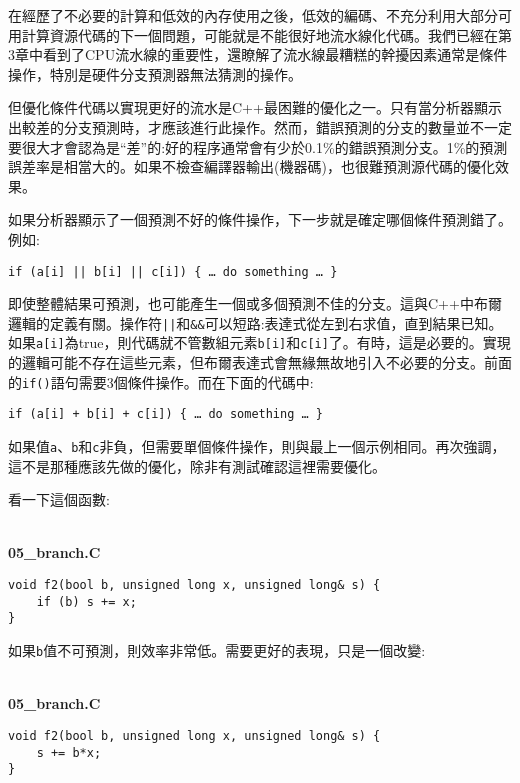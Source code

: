 在經歷了不必要的計算和低效的內存使用之後，低效的編碼、不充分利用大部分可用計算資源代碼的下一個問題，可能就是不能很好地流水線化代碼。我們已經在第3章中看到了CPU流水線的重要性，還瞭解了流水線最糟糕的幹擾因素通常是條件操作，特別是硬件分支預測器無法猜測的操作。 

但優化條件代碼以實現更好的流水是C++最困難的優化之一。只有當分析器顯示出較差的分支預測時，才應該進行此操作。然而，錯誤預測的分支的數量並不一定要很大才會認為是“差”的:好的程序通常會有少於0.1\%的錯誤預測分支。1\%的預測誤差率是相當大的。如果不檢查編譯器輸出(機器碼)，也很難預測源代碼的優化效果。

如果分析器顯示了一個預測不好的條件操作，下一步就是確定哪個條件預測錯了。例如:

\begin{lstlisting}[style=styleCXX]
if (a[i] || b[i] || c[i]) { … do something … }
\end{lstlisting}

即使整體結果可預測，也可能產生一個或多個預測不佳的分支。這與C++中布爾邏輯的定義有關。操作符\texttt{||}和\texttt{\&\&}可以短路:表達式從左到右求值，直到結果已知。如果\texttt{a[i]}為true，則代碼就不管數組元素\texttt{b[i]}和\texttt{c[i]}了。有時，這是必要的。實現的邏輯可能不存在這些元素，但布爾表達式會無緣無故地引入不必要的分支。前面的\texttt{if()}語句需要3個條件操作。而在下面的代碼中:

\begin{lstlisting}[style=styleCXX]
if (a[i] + b[i] + c[i]) { … do something … }
\end{lstlisting}

如果值\texttt{a}、\texttt{b}和\texttt{c}非負，但需要單個條件操作，則與最上一個示例相同。再次強調，這不是那種應該先做的優化，除非有測試確認這裡需要優化。

看一下這個函數:

\hspace*{\fill} \\ %
\noindent
\textbf{05\_branch.C}
\begin{lstlisting}[style=styleCXX]
void f2(bool b, unsigned long x, unsigned long& s) {
	if (b) s += x;
}
\end{lstlisting}

如果\texttt{b}值不可預測，則效率非常低。需要更好的表現，只是一個改變:

\hspace*{\fill} \\ %
\noindent
\textbf{05\_branch.C}
\begin{lstlisting}[style=styleCXX]
void f2(bool b, unsigned long x, unsigned long& s) {
	s += b*x;
}
\end{lstlisting}

